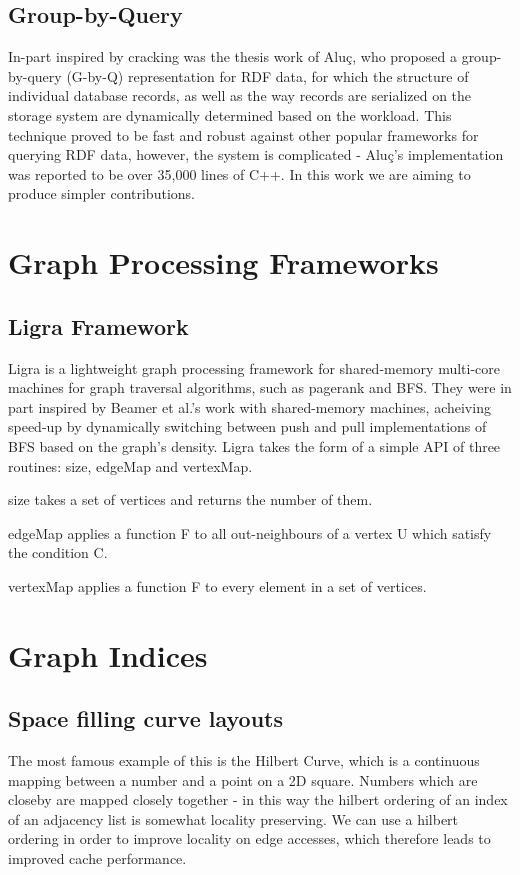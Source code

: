 \subsection{Group-by-Query}

In-part inspired by cracking was the thesis work of Aluç, who proposed a group-by-query (G-by-Q)
representation for RDF data, for which the structure of individual database records, as well as
the way records are serialized on the storage system are dynamically determined based on the
workload. This technique proved to be fast and robust against other popular frameworks for
querying RDF data, however, the system is complicated - Aluç's implementation was reported to be
over 35,000 lines of C++. In this work we are aiming to produce simpler contributions.

\section{Graph Processing Frameworks}

\subsection{Ligra Framework}

Ligra is a lightweight graph processing framework for shared-memory multi-core machines for graph
traversal algorithms, such as pagerank and BFS. They were in part inspired by Beamer et al.'s work
with shared-memory machines, acheiving speed-up by dynamically switching between push and pull implementations of BFS based on the graph's density. Ligra takes the form of a simple API of three
routines: size, edgeMap and vertexMap.

size takes a set of vertices and returns the number of them.

edgeMap applies a function F to all out-neighbours of a vertex U which satisfy the condition C.

vertexMap applies a function F to every element in a set of vertices.

\section{Graph Indices}

\subsection{Space filling curve layouts}

The most famous example of this is the Hilbert Curve, which is a continuous mapping between a number
and a point on a 2D square. Numbers which are closeby are mapped closely together - in this way the
hilbert ordering of an index of an adjacency list is somewhat locality preserving. We can use a
hilbert ordering in order to improve locality on edge accesses, which therefore leads to improved
cache performance.

